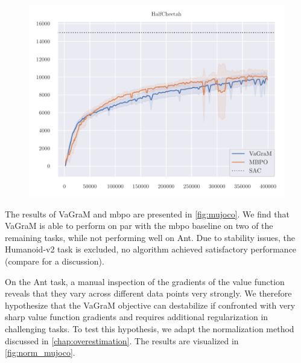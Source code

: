 \begin{figure}[t]
\begin{center}
\begin{minipage}{.49\textwidth}
    \centering
    \includegraphics[width=\textwidth]{figures/vagram/cheetah_nonorm.pdf}
\end{minipage}
\end{center}
    \caption{}
    \label{fig:mujoco}
\end{figure}


The results of VaGraM and \ac{mbpo} are presented in \autoref{fig:mujoco}.
We find that VaGraM is able to perform on par with the \ac{mbpo} baseline on two of the remaining tasks, while not performing well on Ant.
Due to stability issues, the Humanoid-v2 task is excluded, no algorithm achieved satisfactory performance (compare \textcite{pineda2021mbrl} for a discussion). 

On the Ant task, a manual inspection of the gradients of the value function reveals that they vary across different data points very strongly.
We therefore hypothesize that the VaGraM objective can destabilize if confronted with very sharp value function gradients and requires additional regularization in challenging tasks.
To test this hypothesis, we adapt the normalization method discussed in \autoref{chap:overestimation}.
The results are visualized in \autoref{fig:norm_mujoco}.

